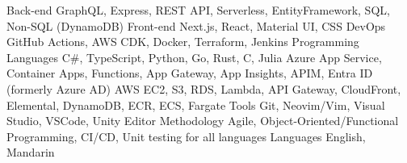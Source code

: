 \begin{cvskills}
  \cvskill
    {Back-end} %
    {GraphQL, Express, REST API, Serverless, EntityFramework, SQL, Non-SQL (DynamoDB)} %
  \cvskill
    {Front-end} %
    {Next.js, React, Material UI, CSS} %
  \cvskill
    {DevOps} %
    {GitHub Actions, AWS CDK, Docker, Terraform, Jenkins} %
  \cvskill
    {Programming Languages} %
    {C\#, TypeScript, Python, Go, Rust, C, Julia} %
  \cvskill
    {Azure} %
    {App Service, Container Apps, Functions, App Gateway, App Insights, APIM, Entra ID (formerly Azure AD)} %
  \cvskill
    {AWS} %
    {EC2, S3, RDS, Lambda, API Gateway, CloudFront, Elemental, DynamoDB, ECR, ECS, Fargate} %
  \cvskill
    {Tools} %
    {Git, Neovim/Vim, Visual Studio, VSCode, Unity Editor} %
  \cvskill
    {Methodology} %
    {Agile, Object-Oriented/Functional Programming, CI/CD, Unit testing for all languages} %
  \cvskill
    {Languages} %
    {English, Mandarin} %
\end{cvskills}
